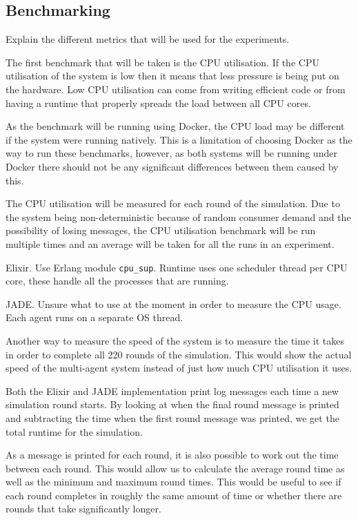 \subsection{Benchmarking}

Explain the different metrics that will be used for the experiments.

The first benchmark that will be taken is the CPU utilisation.
If the CPU utilisation of the system is low then it means that less pressure is being put on the hardware.
Low CPU utilisation can come from writing efficient code or from having a runtime that properly spreads the load between all CPU cores.

As the benchmark will be running using Docker, the CPU load may be different if the system were running natively.
This is a limitation of choosing Docker as the way to run these benchmarks, however, as both systems will be running under Docker there should not be any significant differences between them caused by this.

The CPU utilisation will be measured for each round of the simulation.
Due to the system being non-deterministic because of random consumer demand and the possibility of losing messages, the CPU utilisation benchmark will be run multiple times and an average will be taken for all the runs in an experiment.

Elixir.
Use Erlang module \verb|cpu_sup|.
Runtime uses one scheduler thread per CPU core, these handle all the processes that are running.

JADE\@.
Unsure what to use at the moment in order to measure the CPU usage.
Each agent runs on a separate OS thread.

Another way to measure the speed of the system is to measure the time it takes in order to complete all 220 rounds of the simulation.
This would show the actual speed of the multi-agent system instead of just how much CPU utilisation it uses.

Both the Elixir and JADE implementation print log messages each time a new simulation round starts.
By looking at when the final round message is printed and subtracting the time when the first round message was printed, we get the total runtime for the simulation.

As a message is printed for each round, it is also possible to work out the time between each round.
This would allow us to calculate the average round time as well as the minimum and maximum round times.
This would be useful to see if each round completes in roughly the same amount of time or whether there are rounds that take significantly longer.

